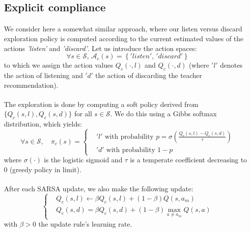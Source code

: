 \documentclass[a4paper]{report}
\begin{document}
{{{{		}
	
		\subsection{Explicit compliance}
		{
			\paragraph{} We consider here a somewhat similar approach, where our listen versus discard exploration policy is computed according to the current estimated values of the actions \emph{'listen'} and \emph{'discard'}. Let us introduce the action spaces: 
			\begin{equation}
				\forall s\in\mathcal{S}, \, \mathcal{A}_c(s) = \left\{ 'listen', \, 'discard'\right\}
			\end{equation}
			to which we assign the action values $Q_c(\cdot,l)$ and $Q_c(\cdot,d)$ (where $'l'$ denotes the action of listening and $'d'$ the action of discarding the teacher recommendation). 
			
			\paragraph{} The exploration is done by computing a soft policy derived from $\{Q_c(s,l), Q_c(s,d)\}$ for all $s\in\mathcal{S}$. We do this using a Gibbs softmax distribution, which yields: 
			\begin{equation}
				\forall s \in\mathcal{S}, \quad \pi_c(s) = 
					\left\{
						\begin{aligned}
							&'l' \text{ with probability } p=\sigma\left(\frac{Q_c(s,l) - Q_c(s,d)}{\tau} \right) \\
							& 'd'  \text{ with probability } 1-p
						\end{aligned}
					\right.
			\end{equation}
			where $\sigma(\cdot)$ is the logistic sigmoid and $\tau$ is a temperate coefficient decreasing to $0$ (greedy policy in limit). 
			
			\paragraph{} After each SARSA update, we also make the following update: 
			\begin{equation}
				\label{eq::av_update_rule}
				\left\{
				\begin{aligned}
					&Q_c(s,l) \leftarrow  \beta Q_c(s,l) + (1-\beta)Q(s,a_m) \\
					&Q_c(s,d) = \beta Q_c(s,d) + (1-\beta)\max_{a\neq a_m} Q(s,a) 
				\end{aligned}
				\right.
			\end{equation}
			with $\beta >0$ the update rule's learning rate. 
}}}}
\end{document}
